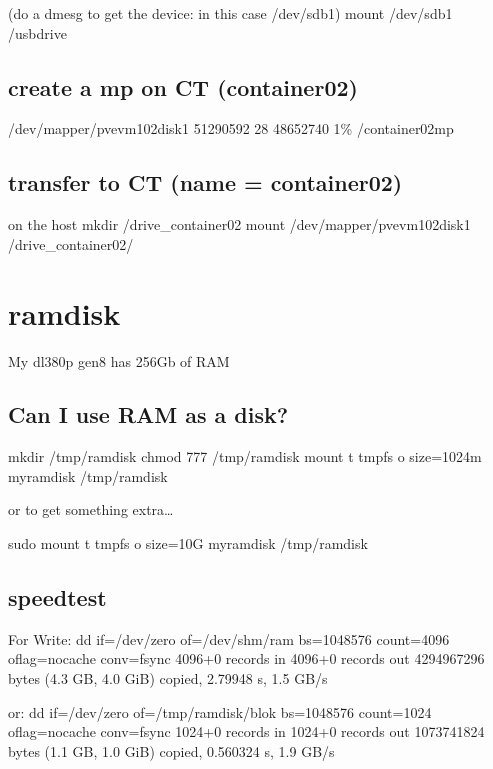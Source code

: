 \documentclass[letterpaper,10pt,english]{sphinxmanual}
\begin{document}
\sphinxAtStartPar
(do a dmesg to get the device: in this case /dev/sdb1)
mount /dev/sdb1 /usbdrive


\section{create a mp on CT (container02)}
\label{\detokenize{usb:create-a-mp-on-ct-container02}}
\sphinxAtStartPar
/dev/mapper/pve\sphinxhyphen{}vm\textendash{}102\textendash{}disk\textendash{}1  51290592        28  48652740   1\% /container02mp


\section{transfer to CT (name = container02)}
\label{\detokenize{usb:transfer-to-ct-name-container02}}
\sphinxAtStartPar
on the host
mkdir /drive\_container02
mount /dev/mapper/pve\sphinxhyphen{}vm\textendash{}102\textendash{}disk\textendash{}1 /drive\_container02/

\sphinxstepscope


\chapter{ramdisk}
\label{\detokenize{ramdisk:ramdisk}}\label{\detokenize{ramdisk::doc}}
\sphinxAtStartPar
My dl380p gen8 has 256Gb of RAM


\section{Can I use RAM as a disk?}
\label{\detokenize{ramdisk:can-i-use-ram-as-a-disk}}
\sphinxAtStartPar
mkdir /tmp/ramdisk
chmod 777 /tmp/ramdisk
mount \sphinxhyphen{}t tmpfs \sphinxhyphen{}o size=1024m myramdisk /tmp/ramdisk

\sphinxAtStartPar
or to get something extra…

\sphinxAtStartPar
sudo mount \sphinxhyphen{}t tmpfs \sphinxhyphen{}o size=10G myramdisk /tmp/ramdisk


\section{speedtest}
\label{\detokenize{ramdisk:speedtest}}
\sphinxAtStartPar
For Write:
dd if=/dev/zero of=/dev/shm/ram bs=1048576 count=4096 oflag=nocache conv=fsync
4096+0 records in
4096+0 records out
4294967296 bytes (4.3 GB, 4.0 GiB) copied, 2.79948 s, 1.5 GB/s

\sphinxAtStartPar
or:
dd if=/dev/zero of=/tmp/ramdisk/blok bs=1048576 count=1024 oflag=nocache conv=fsync
1024+0 records in
1024+0 records out
1073741824 bytes (1.1 GB, 1.0 GiB) copied, 0.560324 s, 1.9 GB/s
\end{document}
